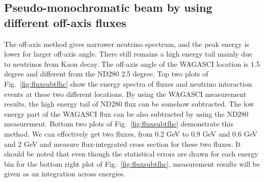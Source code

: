 


\subsection{Pseudo-monochromatic beam by using different off-axis fluxes}
The off-axis method gives narrower neutrino spectrum, and the peak energy is lower for larger off-axis angle.
There still remains a high energy tail mainly due to neutrinos from Kaon decay.
The off-axis angle of the WAGASCI location is 1.5 degree and different from the ND280 2.5 degree.
Top two plots of Fig.~\ref{fig:fluxsubtfhc} show the energy spectra of fluxes and neutrino interaction events
at these two different locations.
By using the WAGASCI measurement results, the high energy tail of ND280 flux can be somehow subtracted.
The low energy part of the WAGASCI flux can be also subtracted by using the ND280 measurement.
Bottom two plots of Fig.~\ref{fig:fluxsubtfhc} demonstrate this method.
We can effectively get two fluxes, from 0.2 GeV to 0.9 GeV and 0.6 GeV and 2 GeV
and measure flux-integrated cross section for these two fluxes.
It should be noted that even though the statistical errors are drawn for each energy bin for the bottom right plot of Fig.~\ref{fig:fluxsubtfhc},
measurement results will be given as an integration across energies.

